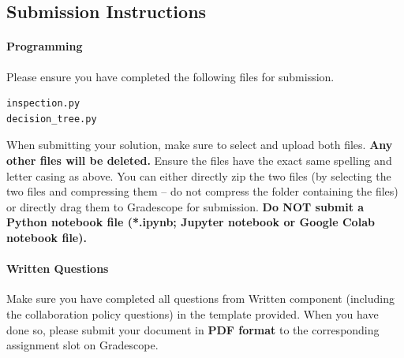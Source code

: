 \documentclass[11pt,addpoints,answers]{exam}
\begin{document}
\subsection{Submission Instructions}

\paragraph{Programming}
Please ensure you have completed the following files for submission.


\begin{verbatim}
inspection.py
decision_tree.py
\end{verbatim}

When submitting your solution, make sure to select and upload both files. \textbf{Any other files will be deleted.} Ensure the files have the exact same spelling and letter casing as above. You can either directly zip the two files (by selecting the two files and compressing them -- do not compress the folder containing the files) or directly drag them to Gradescope for submission. \textbf{Do NOT submit a Python notebook file (*.ipynb; Jupyter notebook or Google Colab notebook file).}


\paragraph{Written Questions}
Make sure you have completed all questions from Written component (including the collaboration policy questions) in the template provided.  When you have done so, please submit your document in \textbf{PDF format} to the corresponding assignment slot on Gradescope.



\newpage
\end{document}
